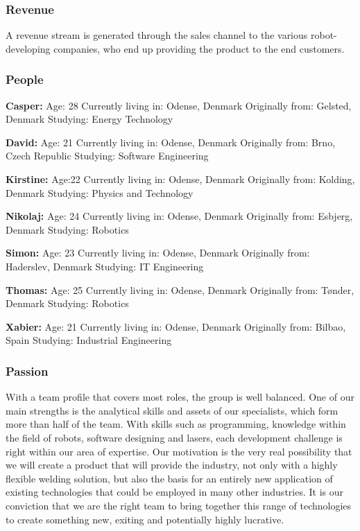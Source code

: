 \subsubsection{Revenue}
A revenue stream is generated through the sales channel to the various robot-developing companies, who end up providing the product to the end customers.   

\subsubsection{People}
\textbf{Casper:}
Age: 28
Currently living in: Odense, Denmark
Originally from: Gelsted, Denmark
Studying: Energy Technology

\textbf{David:}
Age: 21
Currently living in: Odense, Denmark
Originally from: Brno, Czech Republic
Studying: Software Engineering

\textbf{Kirstine:}
Age:22
Currently living in: Odense, Denmark
Originally from: Kolding, Denmark
Studying: Physics and Technology

\textbf{Nikolaj:}
Age: 24
Currently living in: Odense, Denmark
Originally from: Esbjerg, Denmark
Studying: Robotics

\textbf{Simon:}
Age: 23
Currently living in: Odense, Denmark
Originally from: Haderslev, Denmark
Studying: IT Engineering

\textbf{Thomas:}
Age: 25
Currently living in: Odense, Denmark
Originally from: Tønder, Denmark
Studying: Robotics

\textbf{Xabier:}
Age: 21
Currently living in: Odense, Denmark
Originally from: Bilbao, Spain
Studying: Industrial Engineering

\subsubsection{Passion}
With a team profile that covers most roles, the group is well balanced. One of our main strengths is the analytical skills and assets of our specialists, which form more than half of the team.  
With skills such as programming, knowledge within the field of robots, software designing and lasers, each development challenge is right within our area of expertise. 
Our motivation is the very real possibility that we will create a product that will provide the industry, not only with a highly flexible welding solution, but also the basis for an entirely new application of existing technologies that could be employed in many other industries.
It is our conviction that we are the right team to bring together this range of technologies to create something new, exiting and potentially highly lucrative.